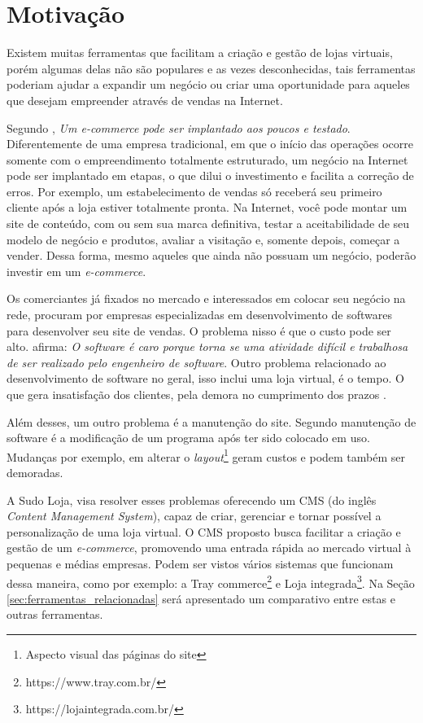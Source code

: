 \documentclass[a4paper,12pt]{monografia}
\begin{document}
\section{Motivação} %
\label{sec:motivacao}

Existem muitas ferramentas que facilitam a criação e gestão de lojas virtuais, porém algumas delas não são populares e as vezes desconhecidas, tais ferramentas poderiam ajudar a expandir um negócio ou criar uma oportunidade para aqueles que desejam empreender através de vendas na Internet. 

Segundo , \textit{Um e-commerce pode ser implantado aos poucos e testado}. Diferentemente de uma empresa tradicional, em que o início das operações ocorre somente com o empreendimento totalmente estruturado, um negócio na Internet pode ser implantado em etapas, o que dilui o investimento e facilita a correção de erros. Por exemplo, um estabelecimento de vendas só receberá seu primeiro cliente após a loja estiver totalmente pronta. Na Internet, você pode montar um site de conteúdo, com ou sem sua marca definitiva, testar a aceitabilidade de seu modelo de negócio e produtos, avaliar a visitação e, somente depois, começar a vender. Dessa forma, mesmo aqueles que ainda não possuam um negócio, poderão investir em um \textit{e-commerce}.

Os comerciantes já fixados no mercado e interessados em colocar seu negócio na rede, procuram por empresas especializadas em desenvolvimento de softwares para desenvolver seu site de vendas. O problema nisso é que o custo pode ser alto.  afirma: \textit{O software é caro porque torna se uma atividade difícil e trabalhosa de ser realizado pelo engenheiro de software}.  Outro problema relacionado ao desenvolvimento de software no geral, isso inclui uma loja virtual, é o tempo. O que gera insatisfação dos clientes, pela demora no cumprimento dos prazos \cite{pressman}.

Além desses, um outro problema é a manutenção do site. Segundo  manutenção de software é a modificação de um programa após ter sido colocado em uso. Mudanças por exemplo, em alterar o \textit{layout}\footnote{Aspecto visual das páginas do site} geram custos e podem também ser demoradas.

A Sudo Loja, visa resolver esses problemas oferecendo um CMS (do inglês \textit{Content Management System}), capaz de criar, gerenciar e tornar possível a personalização de uma loja virtual. O CMS proposto busca facilitar a criação e gestão de um \textit{e-commerce}, promovendo uma entrada rápida ao mercado virtual à pequenas e médias empresas. Podem ser vistos vários sistemas que funcionam dessa maneira, como por exemplo: a Tray commerce\footnote{https://www.tray.com.br/} e Loja integrada\footnote{https://lojaintegrada.com.br/}. Na Seção \ref{sec:ferramentas_relacionadas} será apresentado um comparativo entre estas e outras ferramentas.
\end{document}
